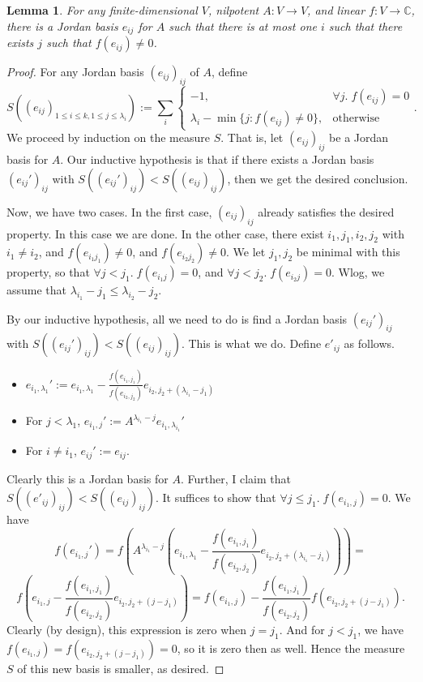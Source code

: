 \documentclass[12pt,psamsfonts]{article}
\newtheorem{lemma}[theorem]{Lemma}
\begin{document}
\begin{lemma}\label{normalization_helper_one}
    For any finite-dimensional \(V\), nilpotent \(A : V \to V\), and linear \(f : V \to \mathbb{C}\), there is a Jordan basis \(e_{ij}\) for \(A\) such that there is at most one \(i\) such that there exists \(j\) such that \(f(e_{ij}) \neq 0\).
\end{lemma}
\begin{proof}
    For any Jordan basis \((e_{ij})_{ij}\) of \(A\), define
    \[S((e_{ij})_{1 \leq i \leq k, 1 \leq j \leq \lambda_i}) := \sum_i \begin{cases}-1, & \forall j. \; f (e_{ij}) = 0 \\ \lambda_i - \min\{j : f (e_{ij}) \neq 0\}, & \textrm{otherwise} \end{cases}.\]
    We proceed by induction on the measure \(S\).
    That is, let \((e_{ij})_{ij}\) be a Jordan basis for \(A\).
    Our inductive hypothesis is that if there exists a Jordan basis \((e_{ij}')_{ij}\) with \(S((e_{ij}')_{ij}) < S((e_{ij})_{ij})\), then we get the desired conclusion.
    \par Now, we have two cases.
    In the first case, \((e_{ij})_{ij}\) already satisfies the desired property.
    In this case we are done.
    In the other case, there exist \(i_1, j_1, i_2, j_2\) with \(i_1 \neq i_2\), and \(f(e_{i_1j_1}) \neq 0\), and \(f(e_{i_2j_2}) \neq 0\).
    We let \(j_1, j_2\) be minimal with this property, so that \(\forall j < j_1. \; f(e_{i_1j}) = 0\), and \(\forall j < j_2. \; f(e_{i_2j}) = 0\).
    Wlog, we assume that \(\lambda_{i_1} - j_1 \leq \lambda_{i_2} - j_2\).
    \par By our inductive hypothesis, all we need to do is find a Jordan basis \((e_{ij}')_{ij}\) with \(S((e_{ij}')_{ij}) < S((e_{ij})_{ij})\).
    This is what we do.
    Define \(e'_{ij}\) as follows.
    \begin{itemize}
        \item \(e_{i_1, \lambda_1}' := e_{i_1, \lambda_1} - \frac{f(e_{i_1, j_1})}{f(e_{i_2, j_2})}e_{i_2, j_2 + (\lambda_{i_1} - j_1)}\)
        \item For \(j < \lambda_1\), \(e_{i_1, j}' := A^{\lambda_{i_1} - j} e_{i_1, \lambda_{i_1}}'\)
        \item For \(i \neq i_1\), \(e_{ij}' := e_{ij}\).
    \end{itemize}
    Clearly this is a Jordan basis for \(A\).
    Further, I claim that \(S((e'_{ij})_{ij})  < S((e_{ij})_{ij})\).
    It suffices to show that \(\forall j \leq j_1. \; f (e_{i_1,j}) = 0\).
    We have 
    \[f (e_{i_1,j}') = f\left(A^{\lambda_{i_1} - j}\left(e_{i_1, \lambda_1} - \frac{f(e_{i_1, j_1})}{f(e_{i_2, j_2})}e_{i_2, j_2 + (\lambda_{i_1} - j_1)}\right)\right) =\]
    \[f\left(e_{i_1, j} - \frac{f(e_{i_1, j_1})}{f(e_{i_2, j_2})} e_{i_2, j_2 + (j - j_1)}\right) = f(e_{i_1, j}) - \frac{f(e_{i_1, j_1})}{f(e_{i_2, j_2})} f(e_{i_2, j_2 + (j - j_1)}).\]
    Clearly (by design), this expression is zero when \(j = j_1\).
    And for \(j < j_1\), we have \(f(e_{i_1, j}) = f(e_{i_2, j_2 + (j - j_1)}) = 0\), so it is zero then as well.
    Hence the measure \(S\) of this new basis is smaller, as desired.
\end{proof}
\end{document}

